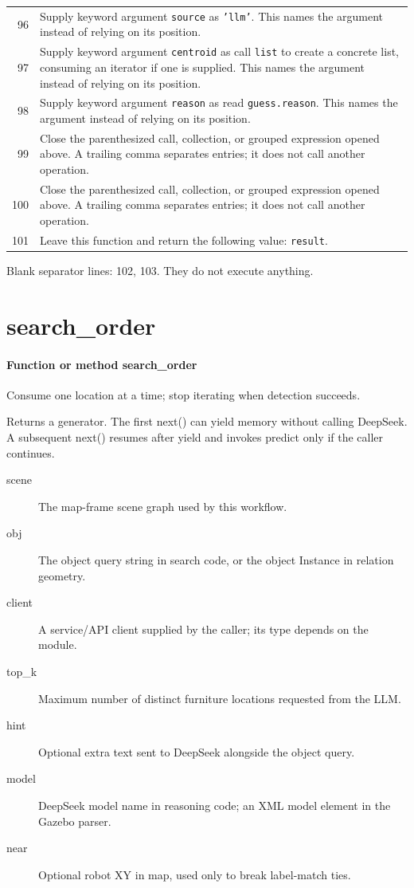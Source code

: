 \documentclass[11pt,a4paper]{book}
\begin{document}
\begin{longtable}{r p{}}
96 & Supply keyword argument \texttt{source} as \texttt{'llm'}. This names the argument instead of relying on its position. \\

97 & Supply keyword argument \texttt{centroid} as call \texttt{list} to create a concrete list, consuming an iterator if one is supplied. This names the argument instead of relying on its position. \\

98 & Supply keyword argument \texttt{reason} as read \texttt{guess.reason}. This names the argument instead of relying on its position. \\

99 & Close the parenthesized call, collection, or grouped expression opened above. A trailing comma separates entries; it does not call another operation. \\

100 & Close the parenthesized call, collection, or grouped expression opened above. A trailing comma separates entries; it does not call another operation. \\

101 & Leave this function and return the following value: \texttt{result}. \\

\end{longtable}

Blank separator lines: 102, 103. They do not execute anything.

\section{search\_order}

\paragraph{Function or method search\_order}
Consume one location at a time; stop iterating when detection succeeds.

Returns a generator. The first next() can yield memory without calling DeepSeek. A subsequent next() resumes after yield and invokes predict only if the caller continues.

\begin{description}
\item[scene] The map-frame scene graph used by this workflow.
\item[obj] The object query string in search code, or the object Instance in relation geometry.
\item[client] A service/API client supplied by the caller; its type depends on the module.
\item[top\_k] Maximum number of distinct furniture locations requested from the LLM.
\item[hint] Optional extra text sent to DeepSeek alongside the object query.
\item[model] DeepSeek model name in reasoning code; an XML model element in the Gazebo parser.
\item[near] Optional robot XY in map, used only to break label-match ties.
\end{description}
\end{document}

